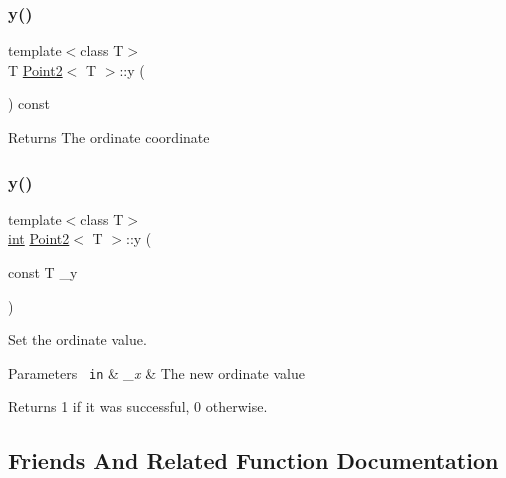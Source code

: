 \subsubsection{\texorpdfstring{y()}{y()}\hspace{0.1cm}{\footnotesize\ttfamily [1/2]}}
{\footnotesize\ttfamily template$<$class T$>$ \\
T \mbox{\hyperlink{class_point2}{Point2}}$<$ T $>$\+::y (\begin{DoxyParamCaption}{ }\end{DoxyParamCaption}) const\hspace{0.3cm}{\ttfamily [inline]}}

\begin{DoxyReturn}{Returns}
The ordinate coordinate 
\end{DoxyReturn}
\mbox{\label{class_point2_ab0682ac817d07137c4d2e6175663a008}} 
\subsubsection{\texorpdfstring{y()}{y()}\hspace{0.1cm}{\footnotesize\ttfamily [2/2]}}
{\footnotesize\ttfamily template$<$class T$>$ \\
\mbox{\hyperlink{draw_8hh_aa620a13339ac3a1177c86edc549fda9b}{int}} \mbox{\hyperlink{class_point2}{Point2}}$<$ T $>$\+::y (\begin{DoxyParamCaption}\item[{const T}]{\+\_\+y }\end{DoxyParamCaption})\hspace{0.3cm}{\ttfamily [inline]}}



Set the ordinate value. 


\begin{DoxyParams}[1]{Parameters}
\mbox{\texttt{ in}}  & {\em \+\_\+x} & The new ordinate value \\
\hline
\end{DoxyParams}
\begin{DoxyReturn}{Returns}
1 if it was successful, 0 otherwise. 
\end{DoxyReturn}


\subsection{Friends And Related Function Documentation}
\mbox{\label{class_point2_a9156326af6248209210a7bd67569e5c2}} 
